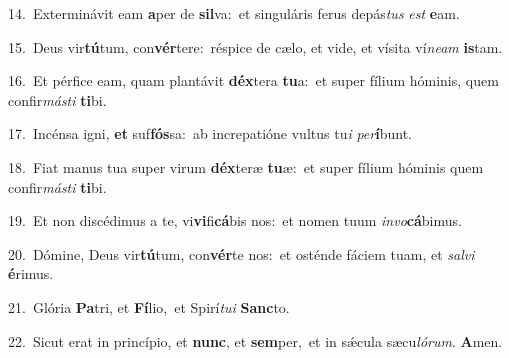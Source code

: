 {\numbfont\textcolor{\numbcolor}{14.}}~Exterminávit eam \textbf{a}\-per de \textbf{sil}\-va:~\star et singuláris ferus depás\textit{tus} \textit{est} \textbf{e}\-am.\par
{\numbfont\textcolor{\numbcolor}{15.}}~Deus vir\-\textbf{tú}\-tum, con\-\textbf{vér}\-tere:~\star réspice de cælo, et vide, et vísita ví\-\textit{ne}\-\textit{am} \textbf{is}\-tam.\par
{\numbfont\textcolor{\numbcolor}{16.}}~Et pérfice eam, quam plantávit \textbf{déx}\-tera \textbf{tu}\-a:~\star et super fílium hóminis, quem confir\-\textit{más}\-\textit{ti} \textbf{ti}\-bi.\par
{\numbfont\textcolor{\numbcolor}{17.}}~Incénsa igni, \textbf{et} suf\-\textbf{fós}\-sa:~\star ab increpatióne vultus tu\textit{i} \textit{per}\-\textbf{í}bunt.\par
{\numbfont\textcolor{\numbcolor}{18.}}~Fiat manus tua super virum \textbf{déx}\-teræ \textbf{tu}\-æ:~\star et super fílium hóminis quem confir\-\textit{más}\-\textit{ti} \textbf{ti}\-bi.\par
{\numbfont\textcolor{\numbcolor}{19.}}~Et non discédimus a te, vi\-\textbf{vi}\-fi\-\textbf{cá}\-bis nos:~\star et nomen tuum \textit{in}\-\textit{vo}\textbf{cá}bimus.\par
{\numbfont\textcolor{\numbcolor}{20.}}~Dómine, Deus vir\-\textbf{tú}\-tum, con\-\textbf{vér}\-te nos:~\star et osténde fáciem tuam, et \textit{sal}\-\textit{vi} \textbf{é}\-rimus.\par
{\numbfont\textcolor{\numbcolor}{21.}}~Glória \textbf{Pa}\-tri, et \textbf{Fí}\-lio,~\star et Spirí\-\textit{tu}\-\textit{i} \textbf{Sanc}\-to.\par
{\numbfont\textcolor{\numbcolor}{22.}}~Sicut erat in princípio, et \textbf{nunc}\-, et \textbf{sem}\-per,~\star et in sǽcula sæcu\-\textit{ló}\-\textit{rum}. \textbf{A}\-men.\par
